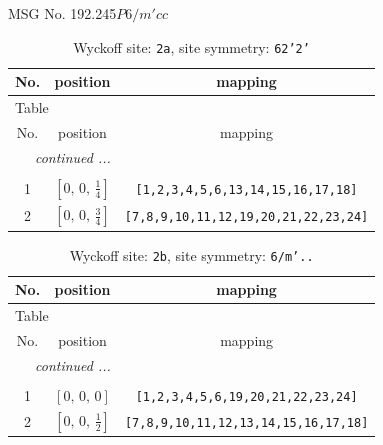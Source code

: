 \documentclass[fleqn,8pt]{jsarticle}
\begin{document}
\setcounter{MaxMatrixCols}{32}

\renewcommand{\tablename}{Table~}
\renewcommand{\figurename}{Figure~}
\begin{center}
\LARGE
MSG No. 192.245\quad$P6/m'cc$
\end{center}
\renewcommand{\arraystretch}{1.2}
\begin{longtable}{ccc}
\caption{Wyckoff site: {\tt 2a}, site symmetry: {\tt 62'2'}}
 \\
 \hline \hline
No. & position & mapping \\ \hline \endfirsthead

\multicolumn{2}{l}{\tablename\ \thetable{}} \\
 \hline \hline
No. & position & mapping \\ \hline \endhead

 \hline \hline
\multicolumn{2}{r}{\footnotesize\it continued ...} \\ \endfoot

 \hline \hline
\multicolumn{2}{r}{} \\ \endlastfoot

1 & $\left[ 0,\, 0,\, \frac{1}{4} \right]$ & {\tt [1,2,3,4,5,6,13,14,15,16,17,18]} \\ \hline
2 & $\left[ 0,\, 0,\, \frac{3}{4} \right]$ & {\tt [7,8,9,10,11,12,19,20,21,22,23,24]} \\
\end{longtable}
\renewcommand{\arraystretch}{1.2}
\begin{longtable}{ccc}
\caption{Wyckoff site: {\tt 2b}, site symmetry: {\tt 6/m'..}}
 \\
 \hline \hline
No. & position & mapping \\ \hline \endfirsthead

\multicolumn{2}{l}{\tablename\ \thetable{}} \\
 \hline \hline
No. & position & mapping \\ \hline \endhead

 \hline \hline
\multicolumn{2}{r}{\footnotesize\it continued ...} \\ \endfoot

 \hline \hline
\multicolumn{2}{r}{} \\ \endlastfoot

1 & $\left[ 0,\, 0,\, 0 \right]$ & {\tt [1,2,3,4,5,6,19,20,21,22,23,24]} \\ \hline
2 & $\left[ 0,\, 0,\, \frac{1}{2} \right]$ & {\tt [7,8,9,10,11,12,13,14,15,16,17,18]} \\
\end{longtable}
\end{document}
